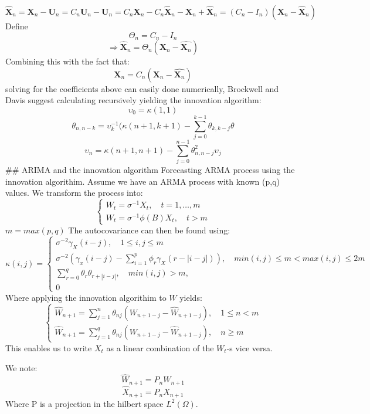 \documentclass[]{article}
\begin{document}
\[\hat{\mathbf{X}}_n = \mathbf{X}_n-\mathbf{U}_n = C_n\mathbf{U}_n - \mathbf{U}_n=C_n\mathbf{X}_n-C_n\hat{\mathbf{X}}_n-\mathbf{X}_n+\hat{\mathbf{X}}_n=(C_n-I_n)(\mathbf{X}_n-\hat{\mathbf{X}}_n)\]
Define \[\Theta_n = C_n - I_n\]
\[\Rightarrow \hat{\mathbf{X}}_n=\Theta_n(\mathbf{X}_n-\hat{\mathbf{X}_n})\]
Combining this with the fact that:
\[\mathbf{X}_n = C_n(\mathbf{X}_n-\hat{\mathbf{X}_n})\] solving for the
coefficients above can easily done numerically, Brockwell and Davis
suggest calculating recursively yielding the innovation algorithm:
\[\upsilon_0=\kappa(1,1)\]
\[\theta_{n,n-k}=\upsilon_k^{-1}(\kappa(n+1, k+1)-\sum_{j=0}^{k-1}\theta_{k,k-j}\theta\]
\[\upsilon_n = \kappa(n+1, n+1)-\sum_{j=0}^{n-1}\theta_{ n,n-j} ^2\upsilon_j\]
\#\# ARIMA and the innovation algorithm Forecasting ARMA process using
the innovation algorithim. Assume we have an ARMA process with known
(p,q) values. We transform the process into: \[           \left\{
                \begin{array}{ll}
                  W_t = \sigma^{-1}X_t, \quad t=1,\dots,m\\
                  W_t = \sigma^{-1}\phi(B)X_t, \quad t>m
                \end{array}
              \right.
\] \(m=max(p,q)\) The autocovariance can then be found using:
\[\kappa(i,j)=\left\{
                \begin{array}{ll}
                  \sigma^{-2}\gamma_X(i-j), \quad 1\leq i,j \leq m \\
                  \sigma^{-2}(\gamma_x(i-j)-\sum_{i=1}^p\phi_r\gamma_X(r-|i-j|)), \quad min(i,j)\leq m < max(i,j)\leq 2m\\
                  \sum_{r=0}^q\theta_r\theta_{r+|i-j|}, \quad min(i,j)>m,\\
                  0
                \end{array}
              \right.\] Where applying the innovation algorithim to
\(W\) yields: \[
\left\{
                \begin{array}{ll}
                  \hat W_{n+1} = \sum_{j=1}^n\theta_{nj}(W_{n+1-j}-\hat W _{n+1-j}), \quad 1\leq n < m \\
                  \hat W_{n+1} = \sum_{j=1}^q\theta_{nj}(W_{n+1-j}-\hat W_{n+1-j}), \quad n \geq m
                \end{array}
              \right.
\] This enables us to write \(X_t\) as a linear combination of the
\(W_t\)-s vice versa.

We note: \[\hat W_{n+1} = P_nW_{n+1}\] \[\hat X_{n+1} = P_nX_{n+1}\]
Where P is a projection in the hilbert space \(L^2(\Omega)\).
\end{document}
